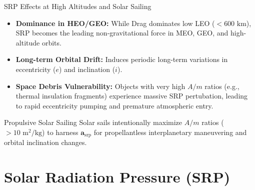 \documentclass[aspectratio=169,11pt]{beamer}
\begin{document}
\begin{frame}{SRP Effects at High Altitudes and Solar Sailing}
    \begin{itemize}
        \item \textbf{Dominance in HEO/GEO:} While Drag dominates low LEO ($< 600\text{ km}$), SRP becomes the leading non-gravitational force in MEO, GEO, and high-altitude orbits.
        \item \textbf{Long-term Orbital Drift:} Induces periodic long-term variations in eccentricity ($e$) and inclination ($i$).
        \item \textbf{Space Debris Vulnerability:} Objects with very high $A/m$ ratios (e.g., thermal insulation fragments) experience massive SRP pertubation, leading to rapid eccentricity pumping and premature atmospheric entry.
    \end{itemize}

    \begin{exampleblock}{Propulsive Solar Sailing}
        Solar sails intentionally maximize $A/m$ ratios ($> 10\text{ m}^2/\text{kg}$) to harness $\mathbf{a}_{\text{srp}}$ for propellantless interplanetary maneuvering and orbital inclination changes.
    \end{exampleblock}
\end{frame}

\section{Solar Radiation Pressure (SRP)}
\end{document}
